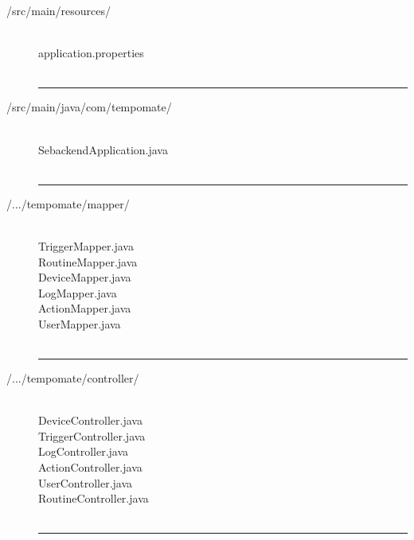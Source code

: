 \begin{enumerate}[label=\alph*]
\begin{description}
              \item[/src/main/resources/] \hfill \\
                    \footnotesize
                    application.properties \\\\
                    \vspace{-0.2cm}
                    \hrule
                    \vspace{0.2cm}

              \item[/src/main/java/com/tempomate/] \hfill \\
                    \footnotesize
                    SebackendApplication.java \\\\
                    \vspace{-0.2cm}
                    \hrule
                    \vspace{0.2cm}

              \item[/.../tempomate/mapper/] \hfill \\
                    \footnotesize
                    TriggerMapper.java \\
                    RoutineMapper.java \\
                    DeviceMapper.java \\
                    LogMapper.java \\
                    ActionMapper.java \\
                    UserMapper.java \\\\
                    \vspace{-0.2cm}
                    \hrule
                    \vspace{0.2cm}

              \item[/.../tempomate/controller/] \hfill \\
                    \footnotesize
                    DeviceController.java \\
                    TriggerController.java \\
                    LogController.java \\
                    ActionController.java \\
                    UserController.java \\
                    RoutineController.java \\\\
                    \vspace{-0.2cm}
                    \hrule
                    \vspace{0.2cm}


\end{description}
\end{enumerate}
